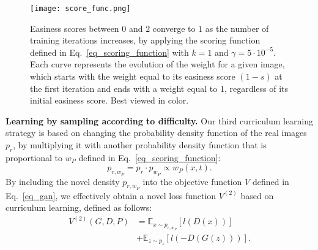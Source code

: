\documentclass[10pt,twocolumn,letterpaper]{article}
\begin{document}
\begin{figure}[!t]
\begin{center}
\texttt{[image: score\_func.png]}
\end{center}
\vspace*{-0.3cm}
\caption{Easiness scores between $0$ and $2$ converge to $1$ as the number of training iterations increases, by applying the scoring function defined in Eq.~\eqref{eq_scoring_function} with $k=1$ and $\gamma = 5 \cdot 10^{-5}$. Each curve represents the evolution of the weight for a given image, which starts with the weight equal to its easiness score $(1-s)$ at the first iteration and ends with a weight equal to 1, regardless of its initial easiness score. Best viewed in color.}
\label{fig_scoring_function}
\vspace*{-0.4cm}
\end{figure}

\noindent
{\bf Learning by sampling according to difficulty.}
Our third curriculum learning strategy is based on changing the probability density function of the real images $p_r$, by multiplying it with another probability density function that is proportional to $w_P$ defined in Eq.~\eqref{eq_scoring_function}:
\begin{equation}
p_{r,w_P} = p_r \cdot p_{w_P} \propto w_P(x,t).
\end{equation}
By including the novel density $p_{r,w_P}$ into the objective function $V$ defined in Eq.~\eqref{eq_gan}, we effectively obtain a novel loss function $V^{(2)}$ based on curriculum learning, defined as follows:
\begin{equation}\label{eq_curriculum3}
\begin{split}
V^{(2)}(G,D,P) &= \mathbb{E}_{x \sim p_{r,w_P}}[l(D(x))]\\
&+ \mathbb{E}_{z \sim p_z}[l(-D(G(z)))].
\end{split}
\end{equation}
\end{document}
